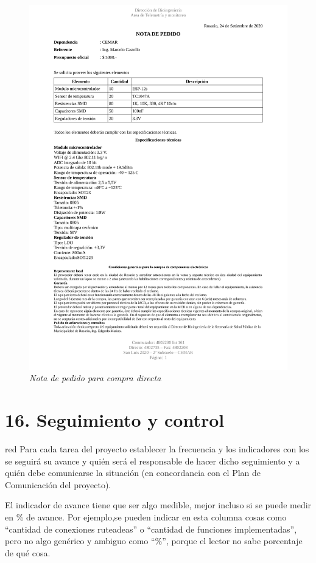 \documentclass[11pt]{charter}
\begin{document}
\begin{figure}[htpb]
\centering 
\includegraphics[width=1\textwidth]{./Figuras/nota_pedido.pdf}
\caption{\textit{Nota de pedido para compra directa}}
\label{nota_pedido}
\end{figure}



\section{16. Seguimiento y control}
\label{sec:seguimiento}

\begin{consigna}{red}
Para cada tarea del proyecto establecer la frecuencia y los indicadores con los se seguirá su avance y quién será el responsable de hacer dicho seguimiento y a quién debe comunicarse la situación (en concordancia con el Plan de Comunicación del proyecto).

El indicador de avance tiene que ser algo medible, mejor incluso si se puede medir en \% de avance. Por ejemplo,se pueden indicar en esta columna cosas como ``cantidad de conexiones ruteadeas'' o ``cantidad de funciones implementadas'', pero no algo genérico y ambiguo como ``\%'', porque el lector no sabe porcentaje de qué cosa.

\end{consigna}
\end{document}
